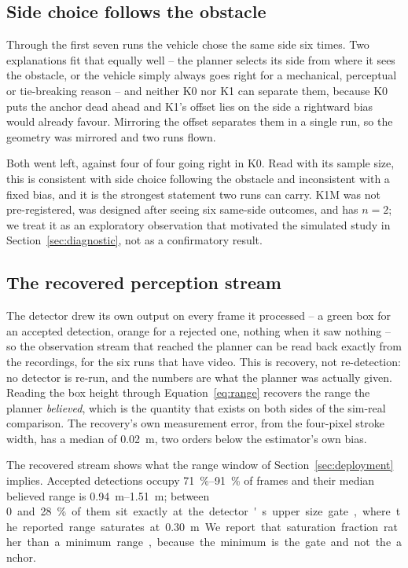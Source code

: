 \subsection{Side choice follows the obstacle}
\label{sec:sidechoice}

Through the first seven runs the vehicle chose the same side six times.
Two explanations fit that equally well -- the planner selects its side
from where it sees the obstacle, or the vehicle simply always goes right
for a mechanical, perceptual or tie-breaking reason -- and neither
\textsf{K0} nor \textsf{K1} can separate them, because \textsf{K0} puts
the anchor dead ahead and \textsf{K1}'s offset lies on the side a
rightward bias would already favour. Mirroring the offset separates
them in a single run, so the geometry was mirrored and two runs flown.

Both went left, against four of four going right in \textsf{K0}. Read
with its sample size, this is consistent with side choice following the
obstacle and inconsistent with a fixed bias, and it is the strongest
statement two runs can carry. \textsf{K1M} was not pre-registered, was
designed after seeing six same-side outcomes, and has $n=2$; we treat
it as an exploratory observation that motivated the simulated study in
Section~\ref{sec:diagnostic}, not as a confirmatory result.

\subsection{The recovered perception stream}

The detector drew its own output on every frame it processed -- a green
box for an accepted detection, orange for a rejected one, nothing when
it saw nothing -- so the observation stream that reached the planner can
be read back exactly from the recordings, for the six runs that have
video. This is recovery, not re-detection: no detector is re-run, and
the numbers are what the planner was actually given. Reading the box
height through Equation~\ref{eq:range} recovers the range the planner
\emph{believed}, which is the quantity that exists on both sides of the
sim-real comparison. The recovery's own measurement error, from the
four-pixel stroke width, has a median of \SI{0.02}{\metre}, two orders
below the estimator's own bias.

The recovered stream shows what the range window of
Section~\ref{sec:deployment} implies. Accepted detections occupy
\SIrange{71}{91}{\percent} of frames and their median believed range is
\SIrange{0.94}{1.51}{\metre}; between \SI{0} and \SI{28}{\percent} of
them sit exactly at the detector's upper size gate, where the reported
range saturates at \SI{0.30}{\metre}. We report that saturation fraction
rather than a minimum range, because the minimum is the gate and not the
anchor.
